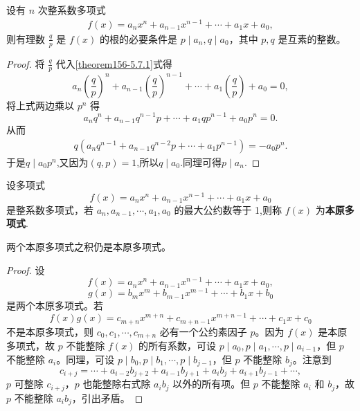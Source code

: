 \documentclass[lang=cn,newtx,10pt,scheme=chinese]{elegantbook}
\begin{document}
\begin{theorem}[整数系数多项式有有理根的必要条件]\label{theorem:整数系数多项式有有理根的必要条件}
设有 \( n \) 次整系数多项式
\begin{align}
f(x) = a_n x^n + a_{n-1} x^{n-1} + \cdots + a_1 x + a_0, \label{theorem156-5.7.1}
\end{align}
则有理数 \( \frac{q}{p} \) 是 \( f(x) \) 的根的必要条件是 \( p \mid a_n, q \mid a_0 \)，其中 \( p, q \) 是互素的整数。
\end{theorem}
\begin{proof}
将 \( \frac{q}{p} \) 代入\eqref{theorem156-5.7.1}式得
\[
a_n \left( \frac{q}{p} \right)^n + a_{n-1} \left( \frac{q}{p} \right)^{n-1} + \cdots + a_1 \left( \frac{q}{p} \right) + a_0 = 0,
\]
将上式两边乘以 \( p^n \) 得
\[
a_n q^n + a_{n-1} q^{n-1} p + \cdots + a_1 q p^{n-1} + a_0 p^n = 0.
\]
从而
\begin{align*}
q\left( a_nq^{n-1}+a_{n-1}q^{n-2}p+\cdots +a_1p^{n-1} \right) =-a_0p^n.
\end{align*}
于是$q\mid a_0p^n$,又因为$(q,p)=1$,所以$q\mid a_0$.同理可得$p \mid a_n$.
\end{proof}

\begin{definition}[本原多项式]
设多项式
\[
f(x) = a_n x^n + a_{n-1} x^{n-1} + \cdots + a_1 x + a_0
\]
是整系数多项式，若 \( a_n, a_{n-1}, \cdots, a_1, a_0 \) 的最大公约数等于 1,则称 \( f(x) \) 为\textbf{本原多项式}.
\end{definition}

\begin{lemma}[Gauss引理]\label{lemma:Gauss引理}
两个本原多项式之积仍是本原多项式。
\end{lemma}
\begin{proof}
设
\[
f(x) = a_n x^n + a_{n-1} x^{n-1} + \cdots + a_1 x + a_0,
\]
\[
g(x) = b_m x^m + b_{m-1} x^{m-1} + \cdots + b_1 x + b_0
\]
是两个本原多项式。若
\[
f(x) g(x) = c_{m+n} x^{m+n} + c_{m+n-1} x^{m+n-1} + \cdots + c_1 x + c_0
\]
不是本原多项式，则 \( c_0, c_1, \cdots, c_{m+n} \) 必有一个公约素因子 \( p \)。因为 \( f(x) \) 是本原多项式，故 \( p \) 不能整除 \( f(x) \) 的所有系数，可设 \( p \mid a_0, p \mid a_1, \cdots, p \mid a_{i-1} \)，但 \( p \) 不能整除 \( a_i \)。同理，可设 \( p \mid b_0, p \mid b_1, \cdots, p \mid b_{j-1} \)，但 \( p \) 不能整除 \( b_j \)。注意到
\[
c_{i+j} = \cdots + a_{i-2} b_{j+2} + a_{i-1} b_{j+1} + a_i b_j + a_{i+1} b_{j-1} + \cdots,
\]
\( p \) 可整除 \( c_{i+j} \)，\( p \) 也能整除右式除 \( a_i b_j \) 以外的所有项。但 \( p \) 不能整除 \( a_i \) 和 \( b_j \)，故 \( p \) 不能整除 \( a_i b_j \)，引出矛盾。
\end{proof}
\end{document}
